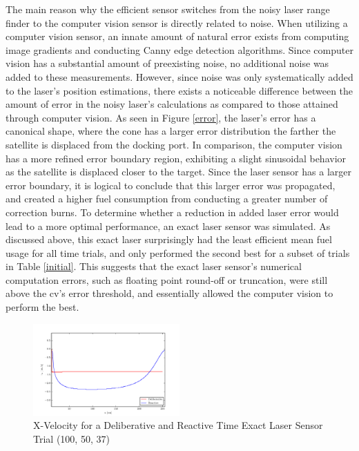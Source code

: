 \documentclass[journal, 10pt]{IEEEtran}
\begin{document}
The main reason why the efficient sensor switches from the noisy laser range finder to the computer vision sensor is directly related to noise. When utilizing a computer vision sensor, an innate amount of natural error exists from computing image gradients and conducting Canny edge detection algorithms. Since computer vision has a substantial amount of preexisting noise, no additional noise was added to these measurements. However, since noise was only systematically added to the laser's position estimations, there exists a noticeable difference between the amount of error in the noisy laser's calculations as compared to those attained through computer vision. As seen in Figure \ref{error}, the laser's error has a canonical shape, where the cone has a larger error distribution the farther the satellite is displaced from the docking port. In comparison, the computer vision has a more refined error boundary region, exhibiting a slight sinusoidal behavior as the satellite is displaced closer to the target. Since the laser sensor has a larger error boundary, it is logical to conclude that this larger error was propagated, and created a higher fuel consumption from conducting a greater number of correction burns. To determine whether a reduction in added laser error would lead to a more optimal performance, an exact laser sensor was simulated. As discussed above, this exact laser surprisingly had the least efficient mean fuel usage for all time trials, and only performed the second best for a subset of trials in Table \ref{initial}. This suggests that the exact laser sensor's numerical computation errors, such as floating point round-off or truncation, were still above the cv's error threshold, and essentially allowed the computer vision to perform the best.


\begin{figure}[tb]
\begin{center}
\includegraphics[width=0.5\textwidth]{figures/xVelocityClean.pdf}
\caption{X-Velocity for a Deliberative and Reactive Time Exact Laser Sensor Trial (100, 50, 37)}
\label{xClean_velocity}
\end{center}
\end{figure}
\end{document}
